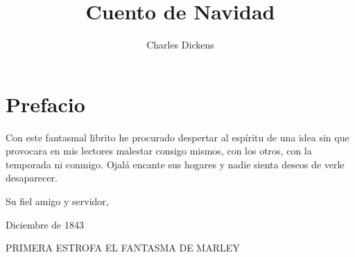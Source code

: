 \documentclass{novela}
\title{Cuento de Navidad}
\author{Charles Dickens}
\date{}
\begin{document}
\frontmatter
	\maketitle
	\tableofcontents
	\chapter{Prefacio}


 Con este fantasmal librito he procurado despertar al espíritu de una idea sin que provocara en mis lectores malestar consigo mismos, con los otros, con la temporada ni conmigo. Ojalá encante sus hogares y nadie sienta deseos de verle desaparecer.


 Su fiel amigo y servidor,


 Diciembre de 1843

 PRIMERA ESTROFA
 EL FANTASMA DE MARLEY
\end{document}
